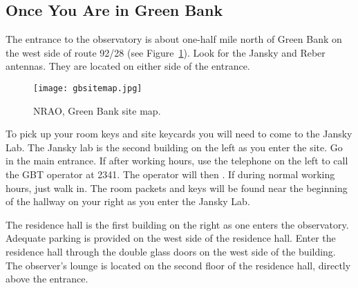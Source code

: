 \subsection{Once You Are in Green Bank}

The entrance to the observatory is about one-half mile north
of  Green Bank on the west side of route 92/28
(see Figure~\ref{fig:sitemap}).
Look for the Jansky and Reber antennas. They are located on 
either side of the entrance.
\begin{figure}
\texttt{[image: gbsitemap.jpg]}
\caption[Green Bank Site Map]{NRAO, Green Bank site map.
\label{fig:sitemap}
}
\end{figure}
  
To pick up your room keys and site keycards you will need to come to the
Jansky Lab. The Jansky lab is the second building on the left as you
enter the site.  Go in the  main entrance.  If after working
hours, use the telephone on the left to call the GBT operator at 2341.
The operator will then .  If during normal working hours,
just walk in. The room packets and keys will be found near the beginning
of the hallway on your right as you enter the Jansky Lab.

The residence hall is the first building on the right as one enters the
observatory. Adequate parking is provided on the west side of the residence
hall. Enter the residence hall through the double glass doors on the west
side of the building.  The observer's lounge is located on the second floor
of the residence hall, directly above the entrance.

